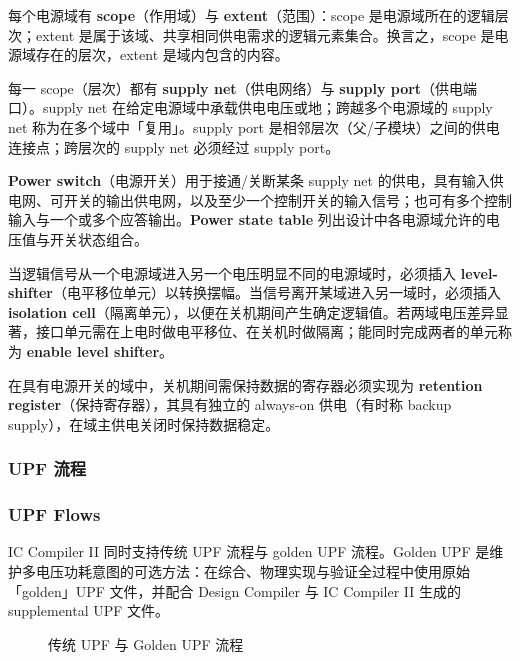 每个电源域有 \textbf{scope}（作用域）与 \textbf{extent}（范围）：scope 是电源域所在的逻辑层次；extent 是属于该域、共享相同供电需求的逻辑元素集合。换言之，scope 是电源域存在的层次，extent 是域内包含的内容。

每一 scope（层次）都有 \textbf{supply net}（供电网络）与 \textbf{supply port}（供电端口）。supply net 在给定电源域中承载供电电压或地；跨越多个电源域的 supply net 称为在多个域中「复用」。supply port 是相邻层次（父/子模块）之间的供电连接点；跨层次的 supply net 必须经过 supply port。

\textbf{Power switch}（电源开关）用于接通/关断某条 supply net 的供电，具有输入供电网、可开关的输出供电网，以及至少一个控制开关的输入信号；也可有多个控制输入与一个或多个应答输出。\textbf{Power state table} 列出设计中各电源域允许的电压值与开关状态组合。

当逻辑信号从一个电源域进入另一个电压明显不同的电源域时，必须插入 \textbf{level-shifter}（电平移位单元）以转换摆幅。当信号离开某域进入另一域时，必须插入 \textbf{isolation cell}（隔离单元），以便在关机期间产生确定逻辑值。若两域电压差异显著，接口单元需在上电时做电平移位、在关机时做隔离；能同时完成两者的单元称为 \textbf{enable level shifter}。

在具有电源开关的域中，关机期间需保持数据的寄存器必须实现为 \textbf{retention register}（保持寄存器），其具有独立的 always-on 供电（有时称 backup supply），在域主供电关闭时保持数据稳定。

\subsubsection{UPF 流程}
\subsubsection*{UPF Flows}

IC Compiler II 同时支持传统 UPF 流程与 golden UPF 流程。Golden UPF 是维护多电压功耗意图的可选方法：在综合、物理实现与验证全过程中使用原始「golden」UPF 文件，并配合 Design Compiler 与 IC Compiler II 生成的 supplemental UPF 文件。

\begin{figure}[htbp]
\centering
{}
\caption{传统 UPF 与 Golden UPF 流程}
\label{fig:upf-flows}
\end{figure}

